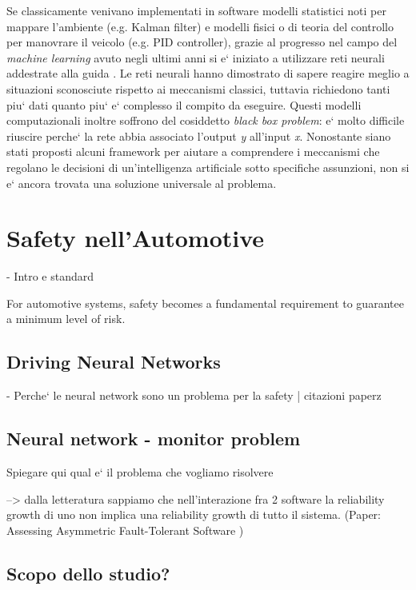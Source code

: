 Se classicamente venivano implementati in software modelli statistici noti per mappare l'ambiente (e.g. Kalman filter) e modelli fisici o di teoria del controllo per manovrare il veicolo (e.g. PID controller), grazie al progresso nel campo del \textsl{machine learning} avuto negli ultimi anni si e` iniziato a utilizzare reti neurali addestrate alla guida \cite{1} \cite{2}.\newline
Le reti neurali hanno dimostrato di sapere reagire meglio a situazioni sconosciute rispetto ai meccanismi classici, tuttavia richiedono tanti piu` dati quanto piu` e` complesso il compito da eseguire.\newline
Questi modelli computazionali inoltre soffrono del cosiddetto \textsl{black box problem}: e` molto difficile riuscire perche` la rete abbia associato l'output \textsl{y} all'input \textsl{x}. Nonostante siano stati proposti alcuni framework \cite{3} per aiutare a comprendere i meccanismi che regolano le decisioni di un'intelligenza artificiale sotto specifiche assunzioni, non si e` ancora trovata una soluzione universale al problema.\newline


\section{Safety nell'Automotive}

-  Intro e standard

For automotive systems, safety becomes a fundamental requirement to guarantee a minimum level of risk.\newline


\subsection{Driving Neural Networks}

 - Perche` le neural network sono un problema per la safety | citazioni paperz

\subsection{Neural network - monitor problem}

Spiegare qui qual e` il problema che vogliamo risolvere

--> dalla letteratura sappiamo che nell'interazione fra 2 software la reliability growth di uno non implica una reliability growth di tutto il sistema. (Paper: Assessing Asymmetric Fault-Tolerant Software )

\subsection{Scopo dello studio?}

